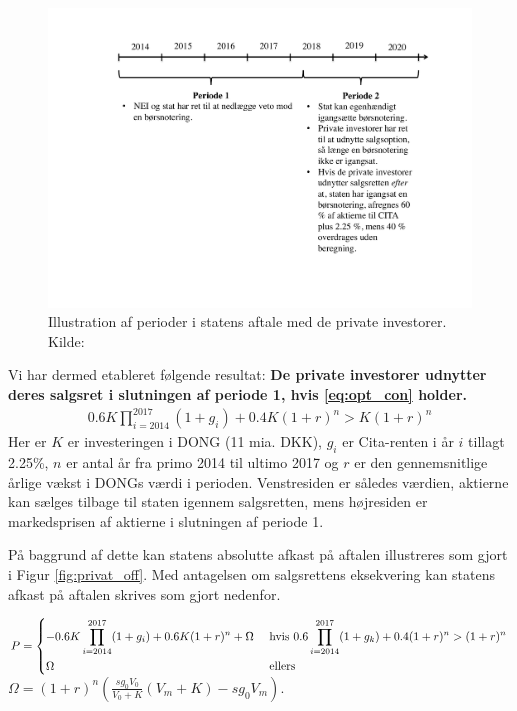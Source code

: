 \documentclass{article}
\begin{document}
\begin{figure}
\includegraphics[scale=0.6]{../figs/perioder}
\caption{Illustration af perioder i statens aftale med de private investorer. Kilde: \citet{FM2013a}}
\label{fig:perioder}
\end{figure}






Vi har dermed etableret følgende resultat: \textbf{De private investorer udnytter deres salgsret i slutningen af periode 1, hvis \eqref{eq:opt_con} holder. } 
\begin{align}
0.6K\prod_{i=2014}^{2017}(1+g_i)+0.4K(1+r)^n>K(1+r)^n \label{eq:opt_con}
\end{align}
Her er $K$ er investeringen i DONG (11 mia. DKK), $g_i$ er Cita-renten i år $i$ tillagt 2.25\%, $n$ er antal år fra primo 2014 til ultimo 2017 og $r$ er den gennemsnitlige årlige vækst i DONGs værdi i perioden. Venstresiden er således værdien, aktierne kan sælges tilbage til staten igennem salgsretten, mens højresiden er markedsprisen af aktierne i slutningen af periode 1.

På baggrund af dette kan statens absolutte afkast på aftalen illustreres som gjort i Figur \ref{fig:privat_off}. Med antagelsen om salgsrettens eksekvering kan statens afkast på aftalen skrives som gjort nedenfor. %

$P=\begin{dcases} 
-0.6K \prod_{i=2014}^{2017} (1+g_i)+0.6K(1+r)^n +\Omega&\text{     hvis    } 0.6\prod_{i=2014}^{2017}(1+g_k)+0.4(1+r)^n>(1+r)^n \\ 
\Omega  &\text{   ellers } 
\end {dcases} $\\
 $\Omega=(1+r)^n\left( \frac{sg_0 V_0}{V_0+K} \left( V_m+K \right)-sg_0 V_m \right)$.
\end{document}
